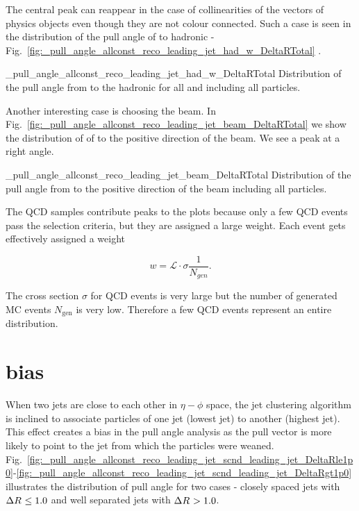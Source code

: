 The central peak can reappear in the case of collinearities of the vectors of physics objects even though they are not colour connected. Such a case is seen in the distribution of the pull angle of \leadingjet to hadronic \PW - Fig.~\ref{fig:_pull_angle_allconst_reco_leading_jet_had_w_DeltaRTotal}
. 

          {_pull_angle_allconst_reco_leading_jet_had_w_DeltaRTotal}
          {Distribution of the pull angle from \leadingjet to the hadronic \PW for all \DeltaR and including all particles.}

Another interesting case is choosing the beam. In Fig.~\ref{fig:_pull_angle_allconst_reco_leading_jet_beam_DeltaRTotal} we show the distribution of \pullangle of \leadingjet to the positive direction of the beam. We see a peak at a right angle.

          {_pull_angle_allconst_reco_leading_jet_beam_DeltaRTotal}
          {Distribution of the pull angle from \leadingjet to the positive direction of the beam including all particles.}

The QCD samples contribute peaks to the plots because only a few QCD events pass the selection criteria, but they are assigned a large weight. Each event gets effectively assigned a weight

\begin{equation}
w=\mathcal{L}\cdot\sigma\frac{1}{N_{gen}}.
\end{equation}

The cross section $\sigma$ for QCD events is very large but the number of generated MC events $N_{\text{gen}}$ is very low. Therefore a few QCD events represent an entire distribution.

\section{\DeltaR bias}

When two jets are close to each other in $\eta-\phi$ space, the jet clustering algorithm is inclined to associate particles of one jet (lowest \pt jet) to another (highest \pt jet). This effect creates a bias in the pull angle analysis as the pull vector is more likely to point to the jet from which the particles were weaned. Fig.~\ref{fig:_pull_angle_allconst_reco_leading_jet_scnd_leading_jet_DeltaRle1p0}-\ref{fig:_pull_angle_allconst_reco_leading_jet_scnd_leading_jet_DeltaRgt1p0} illustrates the distribution of pull angle for two cases - closely spaced jets with $\Delta R^{}\leq1.0$ and well separated jets with $\Delta R^{}>1.0$.

